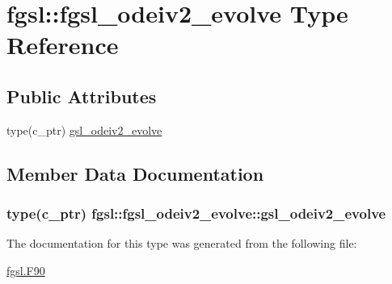 \hypertarget{structfgsl_1_1fgsl__odeiv2__evolve}{\section{fgsl\-:\-:fgsl\-\_\-odeiv2\-\_\-evolve Type Reference}
\label{structfgsl_1_1fgsl__odeiv2__evolve}
}
\subsection*{Public Attributes}
\begin{DoxyCompactItemize}
\item 
type(c\-\_\-ptr) \hyperlink{structfgsl_1_1fgsl__odeiv2__evolve_a6f57a9501060650aca97143be903f7f0}{gsl\-\_\-odeiv2\-\_\-evolve}
\end{DoxyCompactItemize}


\subsection{Member Data Documentation}
\hypertarget{structfgsl_1_1fgsl__odeiv2__evolve_a6f57a9501060650aca97143be903f7f0}{
\subsubsection[{gsl\-\_\-odeiv2\-\_\-evolve}]{\setlength{\rightskip}{0pt plus 5cm}type(c\-\_\-ptr) fgsl\-::fgsl\-\_\-odeiv2\-\_\-evolve\-::gsl\-\_\-odeiv2\-\_\-evolve}}\label{structfgsl_1_1fgsl__odeiv2__evolve_a6f57a9501060650aca97143be903f7f0}


The documentation for this type was generated from the following file\-:\begin{DoxyCompactItemize}
\item 
\hyperlink{fgsl_8F90}{fgsl.\-F90}\end{DoxyCompactItemize}
